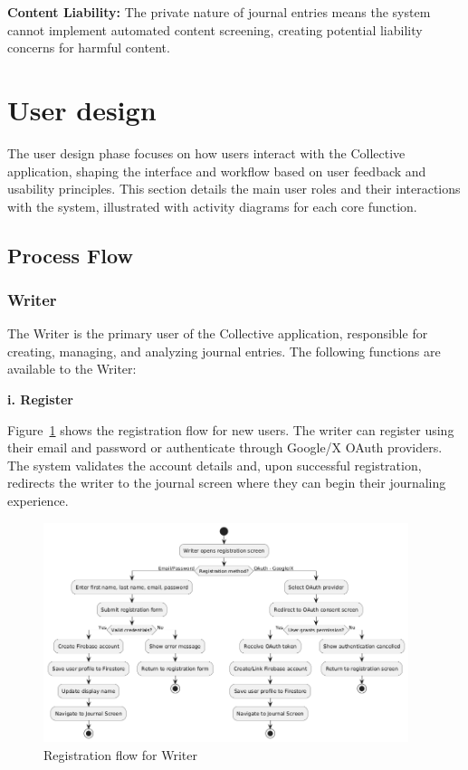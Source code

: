 \textbf{Content Liability:} The private nature of journal entries means the system cannot implement automated content screening, creating potential liability concerns for harmful content.

\section{User design}\label{sec:userDesign}


The user design phase focuses on how users interact with the Collective application, shaping the interface and workflow based on user feedback and usability principles. This section details the main user roles and their interactions with the system, illustrated with activity diagrams for each core function.

\subsection{Process Flow}\label{subsec:processFlow}

\subsubsection{Writer}\label{subsubsec:writer}

The Writer is the primary user of the Collective application, responsible for creating, managing, and analyzing journal entries. The following functions are available to the Writer:

\textbf{i. Register}

Figure~\ref{fig:register-flow} shows the registration flow for new users. The writer can register using their email and password or authenticate through Google/X OAuth providers. The system validates the account details and, upon successful registration, redirects the writer to the journal screen where they can begin their journaling experience.

\begin{figure}[H]
\centering
\includegraphics[width=0.95\textwidth,height=0.7\textheight,keepaspectratio]{files/imgs/register_flow.png}
\caption{Registration flow for Writer}
\label{fig:register-flow}
\end{figure}
\clearpage

